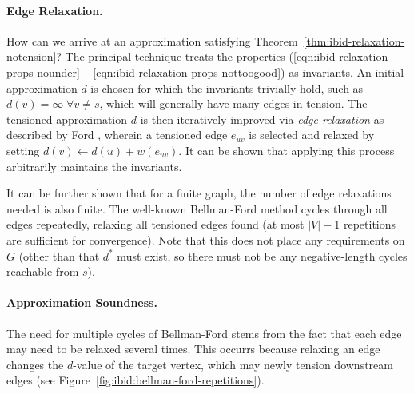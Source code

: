 \paragraph{Edge Relaxation.}
How can we arrive at an approximation
satisfying Theorem~\ref{thm:ibid-relaxation-notension}?
The principal technique treats the properties
(\ref{eqn:ibid-relaxation-props-nounder} --
\ref{eqn:ibid-relaxation-props-nottoogood}) as invariants.
An initial approximation $d$ is chosen for which the invariants
trivially hold,
such as $d(v) = \infty \;\forall v \neq s$,
which will generally have many edges in tension.
The tensioned approximation $d$ is then iteratively improved
via \emph{edge relaxation}
as described by Ford \citep{ford1955networkflowtheory},
wherein a tensioned edge $e_{uv}$ is selected and relaxed
by setting $d(v) \leftarrow d(u) + w(e_{uv})$.
It can be shown that applying this process arbitrarily
maintains the invariants.

It can be further shown that for a finite graph,
the number of edge relaxations needed is also finite.
The well-known Bellman-Ford method
\citep{shimbel1955communicationnets, bellman1958routing,
moore1959spmaze}
cycles through all edges repeatedly,
relaxing all tensioned edges found
(at most $|V|-1$ repetitions are sufficient for convergence).
Note that this does not place any requirements on $G$
(other than that $d^*$ must exist, so there must not be
any negative-length cycles reachable from $s$).

\paragraph{Approximation Soundness.}
The need for multiple cycles of Bellman-Ford stems from the fact
that each edge may need to be relaxed several times.
This occurrs because relaxing an edge changes the
$d$-value of the target vertex,
which may newly tension downstream edges
(see Figure~\ref{fig:ibid:bellman-ford-repetitions}).

